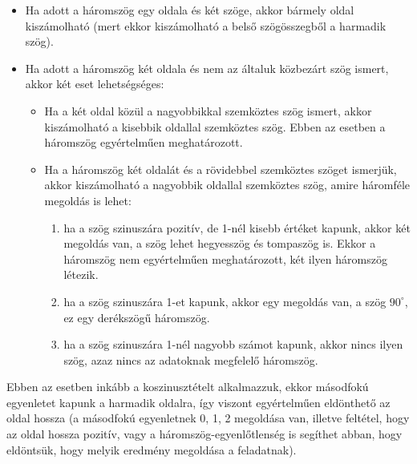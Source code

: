 \documentclass[12pt,a4paper]{article}
\begin{document}
\begin{itemize}
\item  Ha adott a háromszög egy oldala és két szöge, akkor bármely oldal kiszámolható (mert ekkor kiszámolható a belső szögösszegből a harmadik szög).
\item Ha adott a háromszög két oldala és nem az általuk közbezárt szög ismert, akkor két eset lehetségséges:
\begin{itemize}
\item  Ha a két oldal közül a nagyobbikkal szemköztes szög ismert, akkor kiszámolható a kisebbik oldallal szemköztes szög. Ebben az esetben a háromszög egyértelműen meghatározott.
\item Ha a háromszög két oldalát és a rövidebbel szemköztes szöget ismerjük, akkor kiszámolható a nagyobbik oldallal szemköztes szög, amire háromféle megoldás is lehet:
\begin{enumerate}
\item ha a szög szinuszára pozitív, de 1-nél kisebb értéket kapunk, akkor két megoldás van, a szög lehet hegyesszög és tompaszög is. Ekkor a háromszög nem egyértelműen meghatározott, két ilyen háromszög létezik.
\item ha a szög szinuszára 1-et kapunk, akkor egy megoldás van, a szög $90^\circ$, ez egy derékszögű háromszög.
\item  ha a szög szinuszára 1-nél nagyobb számot kapunk, akkor nincs ilyen szög, azaz nincs az adatoknak megfelelő háromszög.
\end{enumerate}
\end{itemize}
\end{itemize}

Ebben az esetben inkább a koszinusztételt alkalmazzuk, ekkor másodfokú egyenletet kapunk a harmadik oldalra, így viszont egyértelműen eldönthető az oldal hossza (a másodfokú egyenletnek 0, 1, 2 megoldása van, illetve feltétel, hogy az oldal hossza pozitív, vagy a háromszög-egyenlőtlenség is segíthet abban, hogy eldöntsük, hogy melyik eredmény megoldása a feladatnak).
\end{document}
